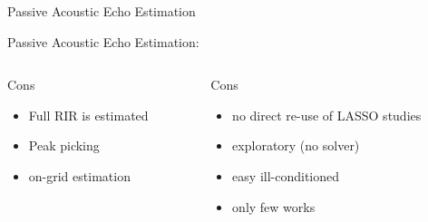 \begin{frame}[t]{Passive Acoustic Echo Estimation}
\begin{block}{\alert{Passive} Acoustic Echo Estimation:}
        \vspace{1em}
        \begin{columns}[T,onlytextwidth] %
            \begin{column}{.48\textwidth}
                Cons
                \begin{itemize}
                    \item Full RIR is estimated
                    \item Peak picking
                    \item on-grid estimation %
                \end{itemize}
            \end{column}
            \begin{column}{.48\textwidth}
                Cons
                \begin{itemize}
                    \item no direct re-use of LASSO studies
                    \item exploratory (no solver)
                    \item easy ill-conditioned
                    \item only few works~\cite{tukuljac2018mulan,condat2015cadzow}
                \end{itemize}
            \end{column}%
        \end{columns}

    \end{block}

\end{frame}

